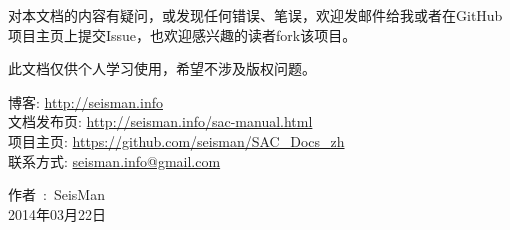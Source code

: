 对本文档的内容有疑问，或发现任何错误、笔误，欢迎发邮件给我或者在GitHub
项目主页上提交Issue，也欢迎感兴趣的读者fork该项目。

此文档仅供个人学习使用，希望不涉及版权问题。

\begin{flushleft}
博客: \url{http://seisman.info}                                         \\
文档发布页: \url{http://seisman.info/sac-manual.html}                   \\
项目主页: \url{https://github.com/seisman/SAC_Docs_zh}                  \\
联系方式: \href{mailto:seisman.info@gmail.com}{seisman.info@gmail.com}  
\end{flushleft}

\begin{flushright}
作者~:~SeisMan \\
2014年03月22日
\end{flushright}
